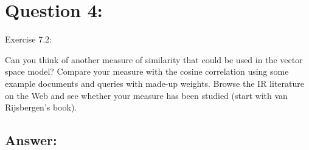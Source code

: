 \section*{Question 4:}
Exercise 7.2: 

Can you think of another measure of similarity that could be used in the vector space model? Compare your measure with the cosine correlation using some example documents and queries with made-up weights. Browse the IR literature on the Web and see whether your measure has been studied (start with van Rijsbergen’s book).


\subsection*{Answer:}
